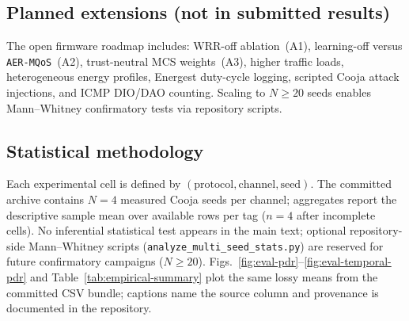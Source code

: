 \begin{aertablewide}[t]
  \begingroup\sloppy\hfuzz=5pt
  \caption{Protocol variants vs.\ control, stability, and security-facing observables (continuation of Table~\ref{tab:proto-metric}).}
  \label{tab:proto-metric-b}
  \sloppy
  \setlength{\tabcolsep}{1.0pt}%
  \endgroup
\end{aertablewide}

\subsection{Planned extensions (not in submitted results)}
\label{sec:validation-plan}
\begingroup\sloppy
The open firmware roadmap includes: WRR-off ablation~(A1), learning-off versus \texttt{AER-MQoS}~(A2), trust-neutral MCS weights~(A3), higher traffic loads, heterogeneous energy profiles, Energest duty-cycle logging, scripted Cooja attack injections, and ICMP DIO/DAO counting. Scaling to $N{\geq}20$ seeds enables Mann--Whitney confirmatory tests via repository scripts.
\endgroup

\subsection{Statistical methodology}
\label{sec:stat-methodology}

Each experimental cell is defined by $(\mathrm{protocol},\mathrm{channel},\mathrm{seed})$. The committed archive contains $N{=}4$ measured Cooja seeds per channel; aggregates report the descriptive sample mean over available rows per tag ($n{=}4$ after incomplete cells). No inferential statistical test appears in the main text; optional repository-side Mann--Whitney scripts (\texttt{analyze\_multi\_seed\_stats.py}) are reserved for future confirmatory campaigns ($N{\geq}20$). Figs.~\ref{fig:eval-pdr}--\ref{fig:eval-temporal-pdr} and Table~\ref{tab:empirical-summary} plot the same lossy means from the committed CSV bundle; captions name the source column and provenance is documented in the repository.

